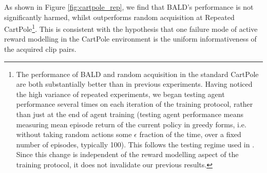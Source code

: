 \documentclass[11pt, a4paper, bibliography=totoc]{report}
\begin{document}
As shown in Figure \ref{fig:cartpole_rep}, we find that BALD's performance is not significantly harmed, whilst outperforms random acquisition at Repeated CartPole\footnote{The performance of BALD and random acquisition in the standard CartPole are both substantially better than in previous experiments. Having noticed the high variance of repeated experiments, we began testing agent performance several times on each iteration of the training protocol, rather than just at the end of agent training (testing agent performance means measuring mean episode return of the current policy in greedy forms, i.e. without taking random actions some $ \epsilon $ fraction of the time, over a fixed number of episodes, typically 100). This follows the testing regime used in \cite{Mnih2015}. Since this change is independent of the reward modelling aspect of the training protocol, it does not invalidate our previous results.}. This is consistent with the hypothesis that one failure mode of active reward modelling in the CartPole environment is the uniform informativeness of the acquired clip pairs.
\end{document}

